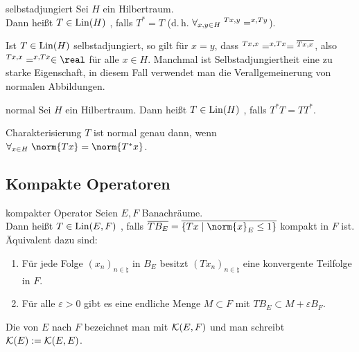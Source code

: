 \linie

\begin{Def}{selbstadjungiert}
    Sei $H$ ein Hilbertraum.\\
    Dann heißt $T \in \operatorname{Lin}(H)$ , falls $T^\ast = T$
    (d.\,h. $\forall_{x, y \in H}\; \sp{Tx, y} = \sp{x, Ty}$).
\end{Def}

\begin{Bem}
    Ist $T \in \operatorname{Lin}(H)$ selbstadjungiert, so gilt für $x = y$, dass
    $\sp{Tx, x} = \sp{x, Tx} = \overline{\sp{Tx, x}}$,
    also $\sp{Tx, x} = \sp{x, Tx} \in \real$ für alle $x \in H$.
    Manchmal ist Selbstadjungiertheit eine zu starke Eigenschaft,
    in diesem Fall verwendet man die Verallgemeinerung von normalen Abbildungen.
\end{Bem}

\begin{Def}{normal}
    Sei $H$ ein Hilbertraum.
    Dann heißt $T \in \operatorname{Lin}(H)$ , falls $T^\ast T = TT^\ast$.
\end{Def}

\begin{Lemma}{Charakterisierung}
    $T$ ist normal genau dann, wenn
    $\forall_{x \in H}\; \norm{Tx} = \norm{T^\ast x}$.
\end{Lemma}

\pagebreak

\subsection{%
    Kompakte Operatoren%
}

\begin{Def}{kompakter Operator}
    Seien $E, F$ Banachräume.\\
    Dann heißt $T \in \operatorname{Lin}(E, F)$ , falls
    $\overline{T B_E} = \overline{\{Tx \;|\; \norm{x}_E \le 1\}}$ kompakt in $F$ ist.\\
    Äquivalent dazu sind:
    \begin{enumerate}
        \item
        Für jede Folge $(x_n)_{n \in \natural}$ in $B_E$ besitzt $(Tx_n)_{n \in \natural}$
        eine konvergente Teilfolge in $F$.

        \item
        Für alle $\varepsilon > 0$ gibt es eine endliche Menge $M \subset F$ mit
        $TB_E \subset M + \varepsilon B_F$.
    \end{enumerate}
    Die  von $E$ nach $F$ bezeichnet man mit
    $\mathcal{K}(E, F)$ und man schreibt $\mathcal{K}(E) := \mathcal{K}(E, E)$.
\end{Def}

